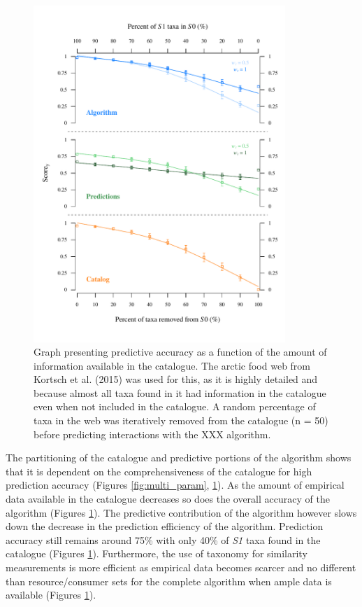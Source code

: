 \documentclass[letterpaper]{article}
\begin{document}
\begin{figure}[h!]
  \centering\includegraphics[width=0.85\textwidth]{catalog_predictions2.pdf}
  \caption{Graph presenting predictive accuracy as a function of the amount of information available in the catalogue. The arctic food web from Kortsch et al. (2015) was used for this, as it is highly detailed and because almost all taxa found in it had information in the catalogue even when not included in the catalogue. A random percentage of taxa in the web was iteratively removed from the catalogue (n = 50) before predicting interactions with the XXX algorithm.}
  \label{fig:catalog_pred}
\end{figure}

The partitioning of the catalogue and predictive portions of the algorithm shows that it is dependent on the comprehensiveness of the catalogue for high prediction accuracy (Figures \ref{fig:multi_param}, \ref{fig:catalog_pred}). As the amount of empirical data available in the catalogue decreases so does the overall accuracy of the algorithm (Figures \ref{fig:catalog_pred}). The predictive contribution of the algorithm however slows down the decrease in the prediction efficiency of the algorithm. Prediction accuracy still remains around 75\% with only 40\% of \textit{S1} taxa found in the catalogue (Figures \ref{fig:catalog_pred}). Furthermore, the use of taxonomy for similarity measurements is more efficient as empirical data becomes scarcer and no different than resource/consumer sets for the complete algorithm when ample data is available (Figures \ref{fig:catalog_pred}).
\end{document}
